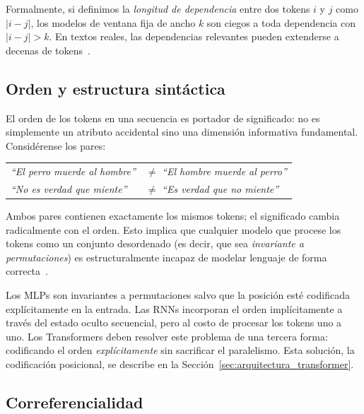 

Formalmente, si definimos la \textit{longitud de dependencia} entre dos
tokens $i$ y $j$ como $|i - j|$, los modelos de ventana fija de ancho $k$
son ciegos a toda dependencia con $|i - j| > k$. En textos reales, las
dependencias relevantes pueden extenderse a decenas de tokens~\cite{vaswani2017attention}.

\subsection{Orden y estructura sintáctica}
\label{subsec:orden}

El orden de los tokens en una secuencia es portador de significado: no es
simplemente un atributo accidental sino una dimensión informativa
fundamental. Considérense los pares:

\begin{center}
\begin{tabular}{ll}
\textit{``El perro muerde al hombre''} & $\neq$ \textit{``El hombre muerde al perro''} \\[2pt]
\textit{``No es verdad que miente''}   & $\neq$ \textit{``Es verdad que no miente''}   \\
\end{tabular}
\end{center}

Ambos pares contienen exactamente los mismos tokens; el significado cambia
radicalmente con el orden. Esto implica que cualquier modelo que procese los
tokens como un conjunto desordenado (es decir, que sea \textit{invariante a
permutaciones}) es estructuralmente incapaz de modelar lenguaje de forma
correcta~\cite{goodfellow2016deeplearning}.

Los MLPs son invariantes a permutaciones salvo que la posición esté
codificada explícitamente en la entrada. Las RNNs incorporan el orden
implícitamente a través del estado oculto secuencial, pero al costo de
procesar los tokens uno a uno. Los Transformers deben resolver este problema
de una tercera forma: codificando el orden \textit{explícitamente} sin
sacrificar el paralelismo. Esta solución, la codificación posicional, se
describe en la Sección~\ref{sec:arquitectura_transformer}.

\subsection{Correferencialidad}
\label{subsec:correferencia}

